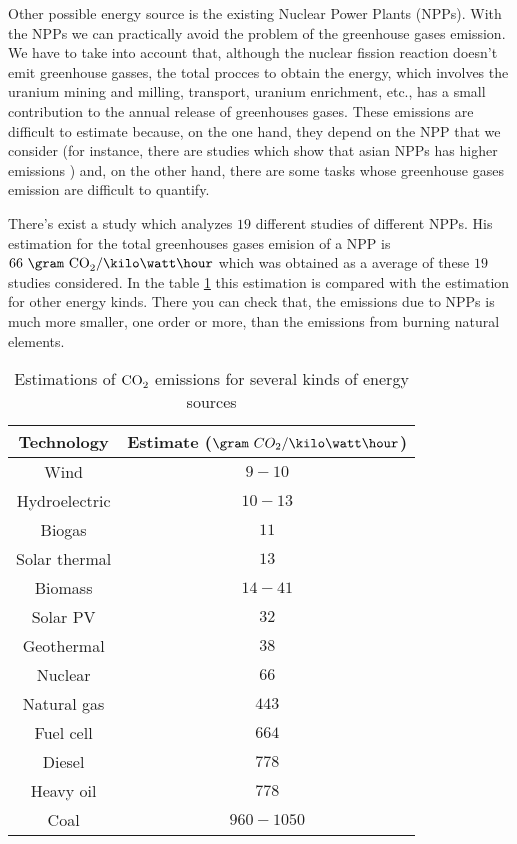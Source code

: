 Other possible  energy source is the existing Nuclear Power Plants (NPPs). With the NPPs we can practically avoid the problem of the greenhouse gases emission. We have to take into account that, although the nuclear fission reaction doesn't emit greenhouse gasses, the total procces to obtain the energy, which involves the uranium mining and milling, transport, uranium enrichment, etc., has a small contribution to the annual release of greenhouses gases. These emissions are difficult to estimate because, on the one hand, they depend on the NPP that we consider (for instance, there are studies which show that asian NPPs has higher emissions \cite{ComparationEmissions}) and, on the other hand, there are some tasks whose greenhouse gases emission are difficult to quantify\cite{ComparationEmissions}. 

There's exist a study \cite{ComparationEmissions} which analyzes $19$ different studies of different NPPs. His estimation for the total greenhouses gases emision of a NPP is $66~\gram~\ce{CO_2} /\kilo\watt\hour$ which was obtained as a average of these $19$ studies considered. In the table \ref{tab:ComparationEmisions} this estimation is compared with the estimation for other energy kinds. There you can check that, the emissions due to NPPs is much more smaller, one order or more, than the emissions from burning natural elements.

\begin{table}[htbp]
\begin{center}
\begin{tabular}{|c|c|}
\hline
Technology & Estimate ($\gram~CO_2 /\kilo\watt\hour$)\\
\hline \hline
Wind & $9-10$ \\ \hline
Hydroelectric & $10-13$ \\ \hline
Biogas & $11$ \\ \hline
Solar thermal & $13$ \\ \hline
Biomass & $14-41$ \\ \hline
Solar PV & $32$ \\ \hline
Geothermal & $38$ \\ \hline
Nuclear & $66$ \\ \hline
Natural gas & $443$ \\ \hline
Fuel cell & $664$ \\ \hline
Diesel & $778$ \\ \hline
Heavy oil & $778$ \\ \hline
Coal & $960-1050$ \\ \hline
\end{tabular}
\caption{Estimations of $\ce{CO_2}$ emissions for several kinds of energy sources\cite{ComparationEmissions}}
\label{tab:ComparationEmisions}
\end{center}
\end{table}

